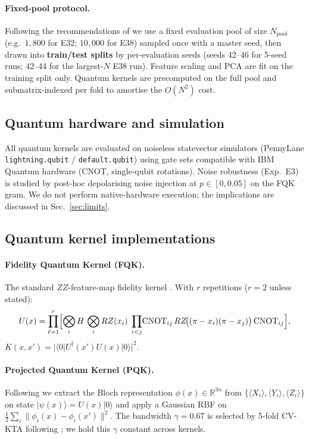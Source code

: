 \documentclass[pdflatex,sn-mathphys-num]{sn-jnl}
\theoremstyle{thmstyleone}
\theoremstyle{thmstyletwo}
\theoremstyle{thmstylethree}
\begin{document}
\paragraph{Fixed-pool protocol.}
Following the recommendations of \cite{schnabel2025} we use a fixed
evaluation pool of size $N_{\text{pool}}$ (e.g.\ $1{,}800$ for E32;
$10{,}000$ for E38) sampled once with a master seed, then drawn into
\textbf{train/test splits} by per-evaluation seeds (seeds 42--46 for
5-seed runs; 42--44 for the largest-$N$ E38 run). Feature scaling and
PCA are fit on the training split only. Quantum kernels are precomputed
on the full pool and submatrix-indexed per fold to amortise the
$O(N^2)$ cost.

\subsection{Quantum hardware and simulation}
All quantum kernels are evaluated on noiseless statevector simulators
(PennyLane \texttt{lightning.qubit} / \texttt{default.qubit}) using
gate sets compatible with IBM Quantum hardware (CNOT, single-qubit
rotations). Noise robustness (Exp.\ E3) is studied by
post-hoc depolarising noise injection at $p\in [0,0.05]$ on the FQK
gram. We do not perform native-hardware execution; the implications are
discussed in Sec.~\ref{sec:limits}.

\subsection{Quantum kernel implementations}\label{sec:kernels}

\paragraph{Fidelity Quantum Kernel (FQK).}
The standard $ZZ$-feature-map fidelity kernel
\cite{havlicek2019,schuld2019}. With $r$ repetitions ($r=2$ unless
stated):
$$
U(x) = \prod_{\ell=1}^{r}\Bigl[\bigotimes_i H \,\bigotimes_i RZ(x_i)\;
\prod_{i<j}\!\mathrm{CNOT}_{ij}\,RZ\!\bigl((\pi-x_i)(\pi-x_j)\bigr)
\,\mathrm{CNOT}_{ij}\Bigr],
$$
$K(x,x')=|\langle 0|U^\dagger(x')U(x)|0\rangle|^2$.

\paragraph{Projected Quantum Kernel (PQK).}
Following \cite{huang2021} we extract the Bloch
representation $\phi(x)\in\mathbb{R}^{3n}$ from
$\{\langle X_i\rangle,\langle Y_i\rangle,\langle Z_i\rangle\}$ on
state $|\psi(x)\rangle=U(x)|0\rangle$ and apply a Gaussian RBF on
$\tfrac{1}{2}\sum_i\|\phi_i(x)-\phi_i(x')\|^2$. The bandwidth
$\gamma=0.67$ is selected by 5-fold CV-KTA following
\cite{shaydulin2022}; we hold this $\gamma$ constant across kernels.
\end{document}
